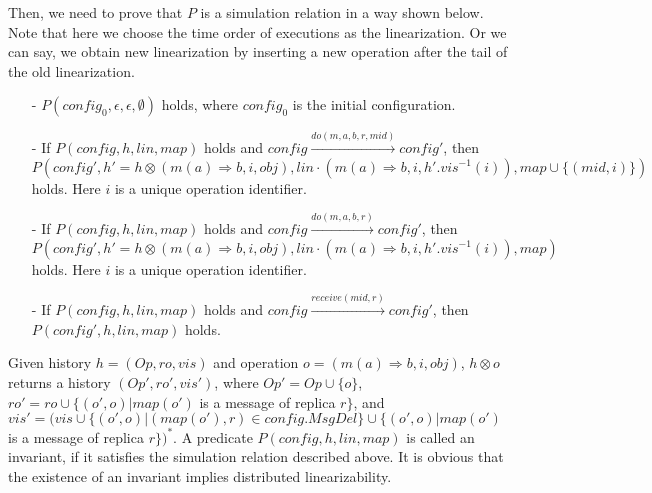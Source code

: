 Then, we need to prove that $P$ is a simulation relation in a way shown below. Note that here we choose the time order of executions as the linearization. Or we can say, we obtain new linearization by inserting a new operation after the tail of the old linearization. 

\begin{itemize}
\setlength{\itemsep}{0.5pt}
\item[-] $P(\mathit{config}_0,\epsilon,\epsilon,\emptyset)$ holds, where $\mathit{config}_0$ is the initial configuration.

\item[-] If $P(\mathit{config},h,\mathit{lin},\mathit{map})$ holds and $\mathit{config} {\xrightarrow{\mathit{do}(m,a,b,r,\mathit{mid})}} \mathit{config}'$, then $P(\mathit{config}', h' = h \otimes (m(a) \Rightarrow b,i,\mathit{obj}), \mathit{lin} \cdot (m(a) \Rightarrow b,i,h'.\mathit{vis}^{-1}(i)),\mathit{map} \cup \{ (\mathit{mid}, i) \})$ holds. Here $i$ is a unique operation identifier.

\item[-] If $P(\mathit{config},h,\mathit{lin},\mathit{map})$ holds and $\mathit{config} {\xrightarrow{\mathit{do}(m,a,b,r)}} \mathit{config}'$, then $P(\mathit{config}',h' = h \otimes (m(a) \Rightarrow b,i,\mathit{obj}), \mathit{lin} \cdot (m(a) \Rightarrow b,i,h'.\mathit{vis}^{-1}(i)),\mathit{map})$ holds. Here $i$ is a unique operation identifier.

\item[-] If $P(\mathit{config},h,\mathit{lin},\mathit{map})$ holds and $\mathit{config} {\xrightarrow{\mathit{receive}(\mathit{mid},r)}} \mathit{config}'$, then $P(\mathit{config}',h,\mathit{lin},\mathit{map})$ holds.
\end{itemize}

Given history $h = (\mathit{Op},\mathit{ro},\mathit{vis})$ and operation $o = (m(a) \Rightarrow b,i,\mathit{obj})$, $h \otimes o$ returns a history $(\mathit{Op}',\mathit{ro}',\mathit{vis}')$, where $\mathit{Op}' = \mathit{Op} \cup \{ o \}$, $\mathit{ro}' = \mathit{ro} \cup \{ (o',o) \vert \mathit{map}(o')$ is a message of replica $r \}$, and $\mathit{vis}' = (\mathit{vis} \cup \{ (o',o) \vert (\mathit{map}(o'),r) \in \mathit{config}.\mathit{MsgDel} \} \cup \{ (o',o) \vert \mathit{map}(o')$ is a message of replica $r \})^*$. A predicate $P(\mathit{config},h,\mathit{lin},\mathit{map})$ is called an invariant, if it satisfies the simulation relation described above. It is obvious that the existence of an invariant implies distributed linearizability. 

